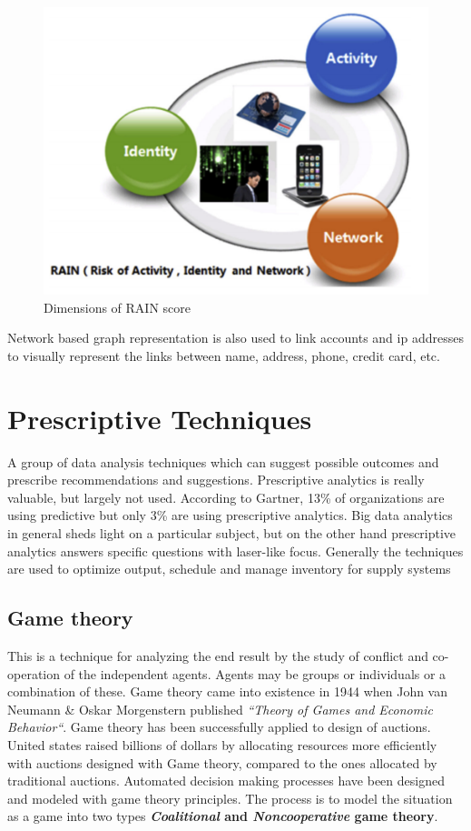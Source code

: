 \begin{figure}[H]
	\includegraphics[scale = 0.8]{figures/RAIN_dimension.png}
	\centering
	\caption{Dimensions of RAIN score}
	\label{fig:rain_dimension}
\end{figure}

Network based graph representation is also used to link accounts and ip addresses to visually represent the links between name, address, phone, credit card, etc.

\chapter{Prescriptive Techniques}
\label{prescriptive-techniques}

A group of data analysis techniques which can suggest possible outcomes and prescribe recommendations and suggestions.
Prescriptive analytics is really valuable, but largely not used. According to Gartner, 13\% of organizations are using predictive but only 3\% are using prescriptive analytics. 
Big data analytics in general sheds light on a particular subject, but on the other hand prescriptive analytics answers specific questions with laser-like focus. 
Generally the techniques are used to optimize output, schedule and manage inventory for supply systems

\section{Game theory}
\label{game-theory}
This is a technique for analyzing the end result by the study of conflict and co-operation of the independent agents. Agents may be groups or individuals or a combination of these. Game theory came into existence in 1944 when John van Neumann \& Oskar Morgenstern published \textit{``Theory of Games and Economic Behavior``}.
Game theory has been successfully applied to design of auctions. 
United states raised billions of dollars by allocating resources more efficiently with auctions designed with Game theory, compared to the ones allocated by traditional auctions.
Automated decision making processes have been designed and modeled with game theory principles. The process is to model the situation as a game into two types \textbf{ \textit{Coalitional} and \textit{Noncooperative} game theory}.



